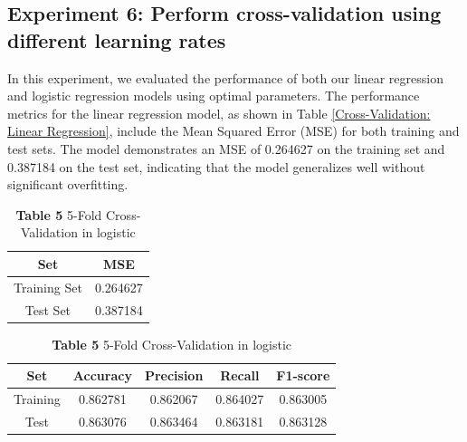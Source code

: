 \documentclass{article}
\begin{document}
\subsection{Experiment 6: Perform cross-validation using different learning rates}

In this experiment, we evaluated the performance of both our linear regression and logistic regression models using optimal parameters. The performance metrics for the linear regression model, as shown in Table \ref{Cross-Validation: Linear Regression}, include the Mean Squared Error (MSE) for both training and test sets. The model demonstrates an MSE of 0.264627 on the training set and 0.387184 on the test set, indicating that the model generalizes well without significant overfitting.

\begin{table}[H]
    \begin{subtable}{0.5\textwidth} %
        \centering
        \vspace{7pt}
        \renewcommand{\arraystretch}{1.5}
        \begin{tabular}{|c|c|}
            \hline
            Set  & MSE \\
            \hline
            Training Set & 0.264627 \\
            Test Set & 0.387184 \\
            \hline
    
        \end{tabular}
        \caption{\textbf{Table 4} 5-Fold Cross-Validation in linear}
        \label{Cross-Validation: Linear Regression}
    \end{subtable}%
    \begin{subtable}{0.5\textwidth} %
        \label{Cross-Validation: Logistic Regression}
        \centering
        \vspace{7pt}
        \renewcommand{\arraystretch}{1.5}
        \begin{tabular}{|c|c|c|c|c|}
            \hline
            \textbf{Set}    & \textbf{Accuracy} & \textbf{Precision} & \textbf{Recall} & \textbf{F1-score} \\
            \hline
            Training        & 0.862781          & 0.862067           & 0.864027        & 0.863005          \\
            \hline
            Test            & 0.863076          & 0.863464           & 0.863181        & 0.863128          \\
            \hline
        \end{tabular}
    \caption{\textbf{Table 5} 5-Fold Cross-Validation in logistic}
    \label{Cross-Validation: Logistic Regression}
    \end{subtable}
    
\end{table}
\end{document}
